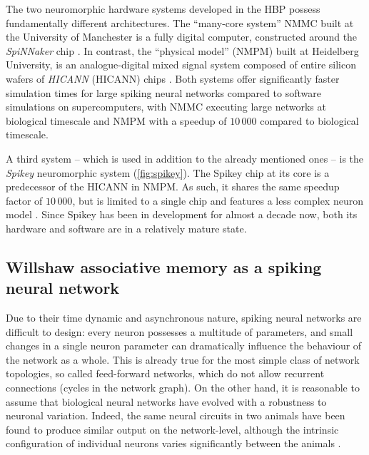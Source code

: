 The two neuromorphic hardware systems developed in the \acrshort{HBP} possess fundamentally different architectures. The \enquote{many-core system} \acrshort{NMMC} built at the University of Manchester is a fully digital computer, constructed around the \emph{SpiNNaker} chip \cite{furber2013overview}. In contrast, the \enquote{physical model} (\acrshort{NMPM}) built at Heidelberg University, is an analogue-digital mixed signal system composed of entire silicon wafers of \emph{HICANN} (\acrlong{HICANN}) chips \cite{schemmel2010wafer,bruderle2011comprehensive}. Both systems offer significantly faster simulation times for large spiking neural networks compared to software simulations on supercomputers, with \acrshort{NMMC} executing large networks at biological timescale and \acrshort{NMPM} with a speedup of $10\,000$ compared to biological timescale.

A third system -- which is used in addition to the already mentioned ones -- is the \emph{Spikey} neuromorphic system (\cref{fig:spikey}). The Spikey chip at its core is a predecessor of the HICANN in \acrshort{NMPM}. As such, it shares the same speedup factor of $10\,000$, but is limited to a single chip and features a less complex neuron model \cite{pfeil2013six}. Since Spikey has been in development for almost a decade now, both its hardware and software are in a relatively mature state.

\subsection{Willshaw associative memory as a spiking neural network}

Due to their time dynamic and asynchronous nature, spiking neural networks are difficult to design: every neuron possesses a multitude of parameters, and small changes in a single neuron parameter can dramatically influence the behaviour of the network as a whole. This is already true for the most simple class of network topologies, so called feed-forward networks, which do not allow recurrent connections (cycles in the network graph). On the other hand, it is reasonable to assume that biological neural networks have evolved with a robustness to neuronal variation. Indeed, the same neural circuits in two animals have been found to produce similar output on the network-level, although the intrinsic configuration of individual neurons varies significantly between the animals  \cite{prinz2004similar, marder2011multiple}.

